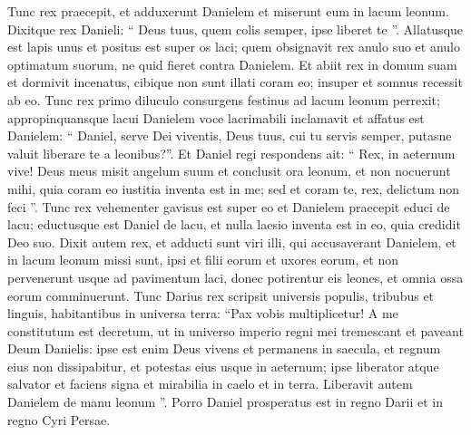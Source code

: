 \begin{biblechapter}
\begin{biblechapter}
\begin{biblechapter}
\begin{biblechapter}
\begin{biblechapter}
\begin{biblechapter}
 \verse Tunc rex praecepit, et adduxerunt Danielem et miserunt eum in lacum leonum. Dixitque rex Danieli: “ Deus tuus, quem colis semper, ipse liberet te ”. 
\verse Allatusque est lapis unus et positus est super os laci; quem obsignavit rex anulo suo et anulo optimatum suorum, ne quid fieret contra Danielem.
 \verse Et abiit rex in domum suam et dormivit incenatus, cibique non sunt illati coram eo; insuper et somnus recessit ab eo. 
\verse Tunc rex primo diluculo consurgens festinus ad lacum leonum perrexit; 
\verse appropinquansque lacui Danielem voce lacrimabili inclamavit et affatus est Danielem: “ Daniel, serve Dei viventis, Deus tuus, cui tu servis semper, putasne valuit liberare te a leonibus?”. 
\verse Et Daniel regi respondens ait: “ Rex, in aeternum vive! 
 \verse Deus meus misit angelum suum et conclusit ora leonum, et non nocuerunt mihi, quia coram eo iustitia inventa est in me; sed et coram te, rex, delictum non feci ”. 
\verse Tunc rex vehementer gavisus est super eo et Danielem praecepit educi de lacu; eductusque est Daniel de lacu, et nulla laesio inventa est in eo, quia credidit Deo suo. 
\verse Dixit autem rex, et adducti sunt viri illi, qui accusaverant Danielem, et in lacum leonum missi sunt, ipsi et filii eorum et uxores eorum, et non pervenerunt usque ad pavimentum laci, donec potirentur eis leones, et omnia ossa eorum comminuerunt.
 \verse Tunc Darius rex scripsit universis populis, tribubus et linguis, habitantibus in universa terra: “Pax vobis multiplicetur! 
\verse A me constitutum est decretum, ut in universo imperio regni mei tremescant et paveant Deum Danielis:
 ipse est enim Deus vivens
 et permanens in saecula,
 et regnum eius non dissipabitur,
 et potestas eius usque in aeternum;
 \verse ipse liberator atque salvator
 et faciens signa et mirabilia
 in caelo et in terra.
 Liberavit autem Danielem
 de manu leonum ”.
 \verse Porro Daniel prosperatus est in regno Darii et in regno Cyri Persae.
 

\end{biblechapter}
\end{biblechapter}
\end{biblechapter}
\end{biblechapter}
\end{biblechapter}
\end{biblechapter}
